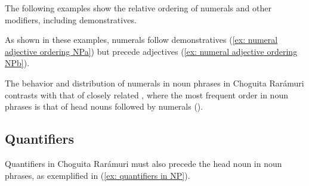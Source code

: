     \z
\z

The following examples show the relative ordering of numerals and other modifiers, including demonstratives.

\ea\label{ex: numeral adjective ordering NP}

    \label{ex: numeral adjective ordering NPa}
        \label{ex: numeral adjective ordering NPb}

    \z
\z

As shown in these examples, numerals follow demonstratives (\ref{ex: numeral adjective ordering NPa}) but precede adjectives (\ref{ex: numeral adjective ordering NPb}).

The behavior and distribution of numerals in noun phrases in Choguita Rarámuri contrasts with that of closely related , where the most frequent order in noun phrases is that of head nouns followed by numerals (\citealt[244]{miller1996guarijio}).

\subsection{Quantifiers}
\label{subsec: quantifiers in noun phrases}

Quantifiers in Choguita Rarámuri must also precede the head noun in noun phrases, as exemplified in (\ref{ex: quantifiers in NP}).

